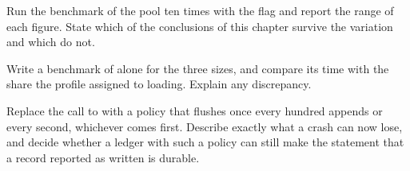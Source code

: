 \begin{exercise}
Run the benchmark of the pool ten times with the  flag and report the range of each figure. State which of the conclusions of this chapter survive the variation and which do not.
\end{exercise}

\begin{exercise}
Write a benchmark of  alone for the three sizes, and compare its time with the share the profile assigned to loading. Explain any discrepancy.
\end{exercise}

\begin{exercise}
Replace the call to  with a policy that flushes once every hundred appends or every second, whichever comes first. Describe exactly what a crash can now lose, and decide whether a ledger with such a policy can still make the statement that a record reported as written is durable.
\end{exercise}
